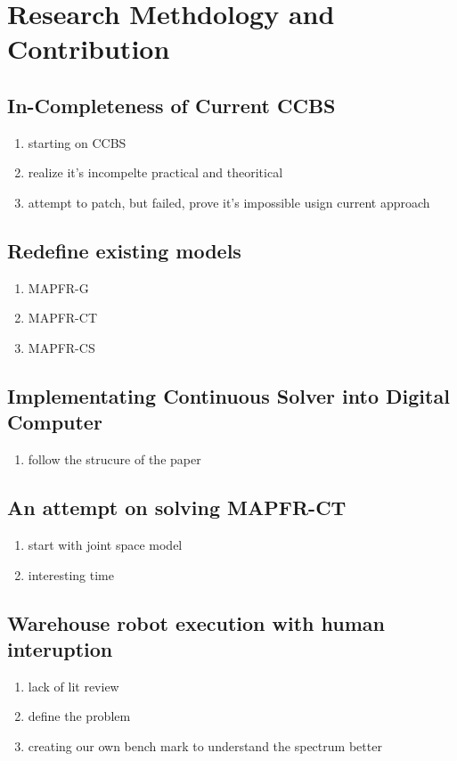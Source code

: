 \chapter{Research Methdology and Contribution}

\section{In-Completeness of Current CCBS}
\begin{enumerate}
    \item starting on CCBS
    \item realize it's incompelte practical and theoritical
    \item attempt to patch, but failed, prove it's impossible usign current approach
\end{enumerate}

\section{Redefine existing models}
\begin{enumerate}
    \item MAPFR-G
    \item MAPFR-CT
    \item MAPFR-CS
\end{enumerate}

\section{Implementating Continuous Solver into Digital Computer}
\begin{enumerate}
    \item follow the strucure of the paper
\end{enumerate}

\section{An attempt on solving MAPFR-CT}
\begin{enumerate}
    \item start with joint space model
    \item interesting time
\end{enumerate}

\section{Warehouse robot execution with human interuption}
\begin{enumerate}
    \item lack of lit review
    \item define the problem
    \item creating our own bench mark to understand the spectrum better
\end{enumerate}

